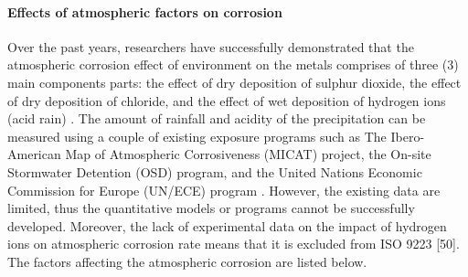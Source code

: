 \documentclass[12pt]{report}
\begin{document}
\paragraph{Effects of atmospheric factors on corrosion} 
Over the past years, researchers have successfully demonstrated that the atmospheric corrosion effect of environment on the metals comprises of three (3) main components parts: the effect of dry deposition of sulphur dioxide, the effect of dry deposition of chloride, and the effect of wet deposition of hydrogen ions (acid rain) \cite{cai2018influence}.
The amount of rainfall and acidity of the precipitation can be measured using a couple of existing exposure programs such as The Ibero-American Map of Atmospheric Corrosiveness (MICAT) project, the On-site Stormwater Detention (OSD) program, and the United Nations Economic Commission for Europe (UN/ECE) program \cite{cai2018influence}. However, the existing data are limited, thus the quantitative models or programs cannot be successfully developed. Moreover, the lack of experimental data on the impact of hydrogen ions on atmospheric corrosion rate means that it is excluded from ISO 9223 [50]. The factors affecting the atmospheric corrosion are listed below.
\end{document}
